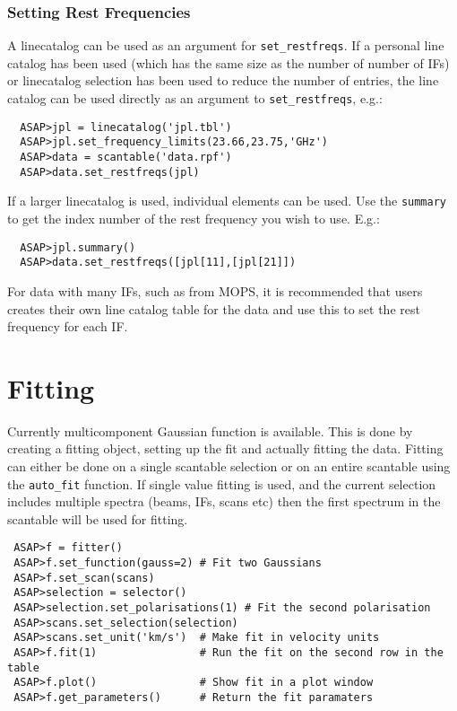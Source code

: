 \documentclass[11pt]{article}
\newcommand{\cmd}[1]{{\tt #1}}
\begin{document}
\subsubsection{Setting Rest Frequencies}

A linecatalog can be used as an
argument for \cmd{set\_restfreqs}. If a personal line catalog has been
used (which has the same size as the number of number of IFs) or
linecatalog selection has been used to reduce the number of entries,
the line catalog can be used directly as an argument to
\cmd{set\_restfreqs}, e.g.:
\begin{verbatim}
  ASAP>jpl = linecatalog('jpl.tbl')
  ASAP>jpl.set_frequency_limits(23.66,23.75,'GHz')
  ASAP>data = scantable('data.rpf')
  ASAP>data.set_restfreqs(jpl)
\end{verbatim}

If a larger linecatalog is used, individual elements can be used. Use
the \cmd{summary} to get the index number of the rest frequency you
wish to use. E.g.:

\begin{verbatim}
  ASAP>jpl.summary()
  ASAP>data.set_restfreqs([jpl[11],[jpl[21]])
\end{verbatim}

For data with many IFs, such as from MOPS, it is recommended
that users creates their own line catalog table for the data and use this
to set the rest frequency for each IF.

\section{Fitting}

Currently multicomponent Gaussian function is
available. This is done by creating a fitting object, setting up the
fit and actually fitting the data. Fitting can either be done on a
single scantable selection or on an entire scantable using the
\cmd{auto\_fit} function. If single value fitting is used, and the
current selection includes multiple spectra (beams, IFs, scans etc)
then the first spectrum in the scantable will be used for fitting.

\begin{verbatim}
 ASAP>f = fitter()
 ASAP>f.set_function(gauss=2) # Fit two Gaussians
 ASAP>f.set_scan(scans)
 ASAP>selection = selector()
 ASAP>selection.set_polarisations(1) # Fit the second polarisation
 ASAP>scans.set_selection(selection)
 ASAP>scans.set_unit('km/s')  # Make fit in velocity units
 ASAP>f.fit(1)                # Run the fit on the second row in the table
 ASAP>f.plot()                # Show fit in a plot window
 ASAP>f.get_parameters()      # Return the fit paramaters
\end{verbatim}
\end{document}
